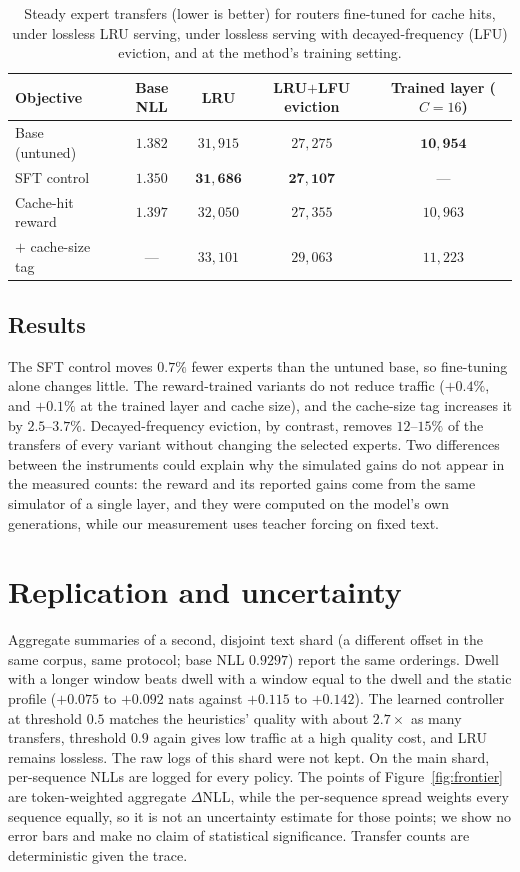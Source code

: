 \documentclass{article}
\begin{document}
\begin{table}[h]
\centering
\caption{Steady expert transfers (lower is better) for routers fine-tuned
for cache hits, under lossless LRU serving, under lossless serving with
decayed-frequency (LFU) eviction, and at the method's training setting.}
\label{tab:workingset}
\small
\begin{tabular}{lcccc}
\toprule
Objective & Base NLL & LRU & LRU$+$LFU eviction & Trained layer ($C{=}16$) \\
\midrule
Base (untuned)           & $1.382$ & $31{,}915$ & $27{,}275$ & $\mathbf{10{,}954}$ \\
SFT control              & $1.350$ & $\mathbf{31{,}686}$ & $\mathbf{27{,}107}$ & --- \\
Cache-hit reward         & $1.397$ & $32{,}050$ & $27{,}355$ & $10{,}963$ \\
\quad $+$ cache-size tag & ---     & $33{,}101$ & $29{,}063$ & $11{,}223$ \\
\bottomrule
\end{tabular}
\end{table}

\subsection{Results}
The SFT control moves $0.7\%$ fewer experts than the
untuned base, so fine-tuning alone changes little. The reward-trained
variants do not reduce traffic ($+0.4\%$, and $+0.1\%$ at the trained layer
and cache size), and the cache-size tag increases it by $2.5$--$3.7\%$.
Decayed-frequency eviction, by contrast, removes $12$--$15\%$ of the
transfers of every variant without changing the selected experts. Two
differences between the instruments could explain why the simulated gains
do not appear in the measured counts: the reward and its reported gains come
from the same simulator of a single layer, and they were computed on the
model's own generations, while our measurement uses teacher forcing on fixed
text.

\section{Replication and uncertainty}
\label{app:replication}

Aggregate summaries of a second, disjoint text shard (a different offset in
the same corpus, same protocol; base NLL $0.9297$) report the same
orderings. Dwell with a longer window beats dwell with a window equal to the
dwell and the static profile ($+0.075$ to $+0.092$ nats against $+0.115$ to
$+0.142$). The learned controller at threshold $0.5$ matches the heuristics'
quality with about $2.7\times$ as many transfers, threshold $0.9$ again
gives low traffic at a high quality cost, and LRU remains lossless. The raw
logs of this shard were not kept. On the main shard, per-sequence NLLs are
logged for every policy. The points of Figure~\ref{fig:frontier} are
token-weighted aggregate $\Delta$NLL, while the per-sequence spread weights
every sequence equally, so it is not an uncertainty estimate for those
points; we show no error bars and make no claim of statistical significance.
Transfer counts are deterministic given the trace.
\end{document}
